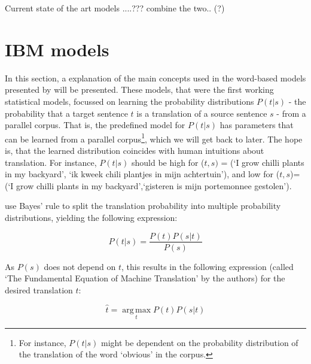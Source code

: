 \documentclass{report}
\theoremstyle{definition}
\theoremstyle{plain}
\begin{document}
Current state of the art models ....??? combine the two.. (?)

\section{IBM models}
\label{sec:IBM}

In this section, a explanation of the main concepts used in the word-based models presented by \cite{brown1993mathematics} will be presented. These models, that were the first working statistical models, focussed on learning the probability distributions $P(t|s)$ - the probability that a target sentence $t$ is a translation of a source sentence $s$ - from a parallel corpus. That is, the predefined model for  $P(t|s)$ has parameters that can be learned from a parallel corpus\footnote{For instance, $P(t|s)$ might be dependent on the probability distribution of the translation of the word `obvious' in the corpus.}, which we will get back to later. The hope is, that the learned distribution coincides with human intuitions about translation. For instance, $P(t|s)$ should be high for ($t,s)$ = (`I grow chilli plants in my backyard', `ik kweek chili plantjes in mijn achtertuin'), and low for ($t,s$)= (`I grow chilli plants in my backyard',`gisteren is mijn portemonnee gestolen').

\citeauthor{brown1988statistical} use Bayes' rule to split the translation probability into multiple probability distributions, yielding the following expression:

\[
P(t|s) = \frac{P(t)P(s|t)}{P(s)}
\]

As $P(s)$ does not depend on $t$, this results in the following expression (called `The Fundamental Equation of Machine Translation' by the authors) for the desired translation $\hat{t}$:

\[
\hat{t} = \operatorname*{arg\,max}_t P(t)P(s|t)
\]
\end{document}
